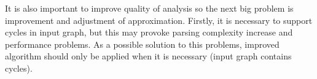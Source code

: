 \documentclass{sigplanconf}
\begin{document}
It is also important to improve quality of analysis so the next big problem is improvement and adjustment of approximation. Firstly, it is necessary to support cycles in input graph, but this may provoke parsing complexity increase and performance problems. As a possible solution to this problems, improved algorithm should only be applied when it is necessary (input graph contains cycles). %










\end{document}
